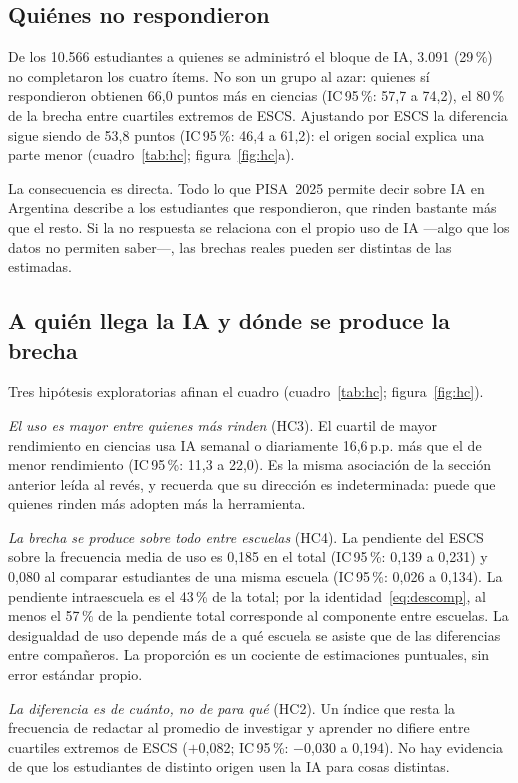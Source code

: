\documentclass[11pt,a4paper]{article}
\newcommand{\pp}{\,p.p.}
\newcommand{\ic}[2]{IC\,95\,\%: #1 a #2}
\begin{document}
\subsection{Quiénes no respondieron}
De los 10.566 estudiantes a quienes se administró el bloque de IA, 3.091 (29\,\%) no completaron los cuatro ítems. No son un grupo al azar: quienes sí respondieron obtienen 66,0 puntos más en ciencias (\ic{57,7}{74,2}), el 80\,\% de la brecha entre cuartiles extremos de ESCS. Ajustando por ESCS la diferencia sigue siendo de 53,8 puntos (\ic{46,4}{61,2}): el origen social explica una parte menor (cuadro~\ref{tab:hc}; figura~\ref{fig:hc}a).

La consecuencia es directa. Todo lo que PISA~2025 permite decir sobre IA en Argentina describe a los estudiantes que respondieron, que rinden bastante más que el resto. Si la no respuesta se relaciona con el propio uso de IA ---algo que los datos no permiten saber---, las brechas reales pueden ser distintas de las estimadas.

\subsection{A quién llega la IA y dónde se produce la brecha}
Tres hipótesis exploratorias afinan el cuadro (cuadro~\ref{tab:hc}; figura~\ref{fig:hc}).

\emph{El uso es mayor entre quienes más rinden} (HC3). El cuartil de mayor rendimiento en ciencias usa IA semanal o diariamente 16,6\pp{} más que el de menor rendimiento (\ic{11,3}{22,0}). Es la misma asociación de la sección anterior leída al revés, y recuerda que su dirección es indeterminada: puede que quienes rinden más adopten más la herramienta.

\emph{La brecha se produce sobre todo entre escuelas} (HC4). La pendiente del ESCS sobre la frecuencia media de uso es 0,185 en el total (\ic{0,139}{0,231}) y 0,080 al comparar estudiantes de una misma escuela (\ic{0,026}{0,134}). La pendiente intraescuela es el 43\,\% de la total; por la identidad~\eqref{eq:descomp}, al menos el 57\,\% de la pendiente total corresponde al componente entre escuelas. La desigualdad de uso depende más de a qué escuela se asiste que de las diferencias entre compañeros. La proporción es un cociente de estimaciones puntuales, sin error estándar propio.

\emph{La diferencia es de cuánto, no de para qué} (HC2). Un índice que resta la frecuencia de redactar al promedio de investigar y aprender no difiere entre cuartiles extremos de ESCS ($+$0,082; \ic{$-$0,030}{0,194}). No hay evidencia de que los estudiantes de distinto origen usen la IA para cosas distintas.
\end{document}
